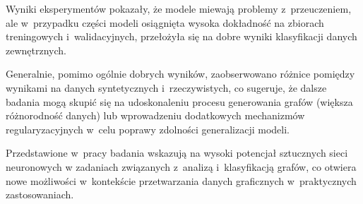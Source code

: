 Wyniki eksperymentów pokazały, że modele miewają problemy z~przeuczeniem,
ale w~przypadku części modeli osiągnięta wysoka dokładność na zbiorach treningowych i~walidacyjnych,
przełożyła się na dobre wyniki klasyfikacji danych zewnętrznych.

Generalnie, pomimo ogólnie dobrych wyników,
zaobserwowano różnice pomiędzy wynikami na danych syntetycznych i~rzeczywistych,
co sugeruje, że dalsze badania mogą skupić się na udoskonaleniu procesu generowania grafów (większa różnorodność danych)
lub wprowadzeniu dodatkowych mechanizmów regularyzacyjnych w~celu poprawy zdolności generalizacji modeli.

Przedstawione w~pracy badania wskazują na wysoki potencjał sztucznych sieci neuronowych
w zadaniach związanych z~analizą i~klasyfikacją grafów,
co otwiera nowe możliwości w~kontekście przetwarzania danych graficznych w~praktycznych zastosowaniach.